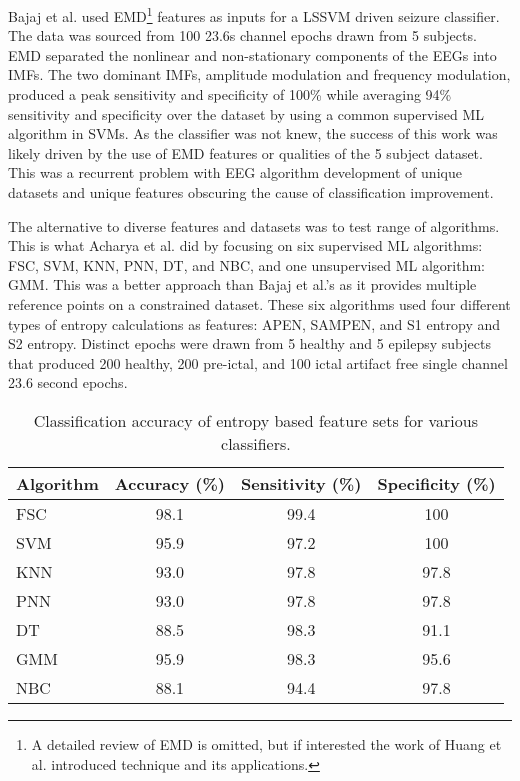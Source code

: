 Bajaj et al.\cite{Bajaj2012} used \ac{EMD}\footnote{A detailed review of \ac{EMD} is omitted, but if interested the work of Huang et al.\cite{Huang1998} introduced technique and its applications.} features as inputs for a \ac{LSSVM} driven seizure classifier. The data was sourced from 100 23.6s channel epochs drawn from 5 subjects. \ac{EMD} separated the nonlinear and non-stationary components of the \acp{EEG} into \acp{IMF}. The two dominant \acp{IMF}, amplitude modulation and frequency modulation, produced a peak sensitivity and specificity of 100\% while averaging 94\% sensitivity and specificity over the dataset by using a common supervised \ac{ML} algorithm in \acp{SVM}. As the classifier was not knew, the success of this work was likely driven by the use of \ac{EMD} features or qualities of the 5 subject dataset. This was a recurrent problem with \ac{EEG} algorithm development of unique datasets and unique features obscuring the cause of classification improvement.

The alternative to diverse features and datasets was to test  range of algorithms. This is what Acharya et al.\cite{Acharya2012} did by focusing on six supervised \ac{ML} algorithms: \ac{FSC}, \ac{SVM}, \ac{KNN}, \ac{PNN}, \ac{DT}, and \ac{NBC}, and one unsupervised \ac{ML} algorithm: \ac{GMM}. This was a better approach than Bajaj et al.'s as it provides multiple reference points on a constrained dataset. These six algorithms used four different types of entropy calculations as features: \ac{APEN}\cite{Pincus1991}, \ac{SAMPEN}\cite{Richman2000}, and S1 entropy and S2 entropy\cite{Nikias1993}. Distinct epochs were drawn from 5 healthy and 5 epilepsy subjects that produced 200 healthy, 200 pre-ictal, and 100 ictal artifact free single channel 23.6 second epochs.

\begin{table}[ht]
\caption[Classification accuracy of entropy based feature sets]{Classification accuracy of entropy based feature sets for various classifiers.}
\centering
\begin{tabular}{ l c c c }
\toprule
Algorithm & Accuracy (\%) & Sensitivity (\%) & Specificity (\%) \\ \midrule
FSC 	& 98.1 & 99.4 & 100\\
SVM 	& 95.9 & 97.2 & 100\\
KNN 	& 93.0 & 97.8 & 97.8\\
PNN 	& 93.0 & 97.8 & 97.8\\
DT 	& 88.5 & 98.3 & 91.1\\
GMM 	& 95.9 & 98.3 & 95.6\\
NBC 	& 88.1 & 94.4 & 97.8\\
\bottomrule
\end{tabular}
\label{tab:acharya}
\end{table}

